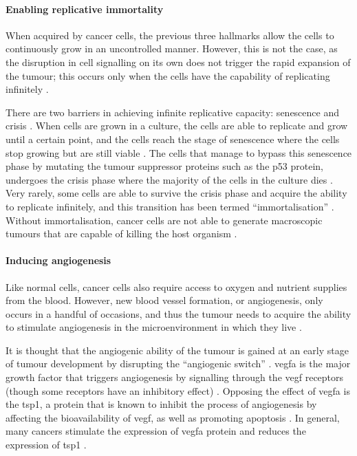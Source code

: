 \paragraph{Enabling replicative immortality}

\noindent
When acquired by cancer cells, the previous three hallmarks allow the cells to continuously grow in an uncontrolled manner.
However, this is not the case, as the disruption in cell signalling on its own does not trigger the rapid expansion of the tumour; this occurs only when the cells have the capability of replicating infinitely \citep{Hanahan2000, Hanahan2011}.

There are two barriers in achieving infinite replicative capacity: senescence and crisis \citep{Hanahan2011}.
When cells are grown in a culture, the cells are able to replicate and grow until a certain point, and the cells reach the stage of senescence where the cells stop growing but are still viable \citep{Hanahan2011}.
The cells that manage to bypass this senescence phase by mutating the tumour suppressor proteins such as the p53 protein, undergoes the crisis phase where the majority of the cells in the culture dies \citep{Hanahan2011}.
Very rarely, some cells are able to survive the crisis phase and acquire the ability to replicate infinitely, and this transition has been termed ``immortalisation'' \citep{Hanahan2011, Wright1989}.
Without immortalisation, cancer cells are not able to generate macroscopic tumours that are capable of killing the host organism \citep{Hanahan2000,Hanahan2011}.

\paragraph{Inducing angiogenesis}

\noindent
Like normal cells, cancer cells also require access to oxygen and nutrient supplies from the blood.
However, new blood vessel formation, or angiogenesis, only occurs in a handful of occasions, and thus the tumour needs to acquire the ability to stimulate angiogenesis in the microenvironment in which they live \citep{Hanahan2011}.

It is thought that the angiogenic ability of the tumour is gained at an early stage of tumour development by disrupting the ``angiogenic switch'' \citep{Hanahan2011}.
\Gls{vegfa} is the major growth factor that triggers angiogenesis by signalling through the \acrshort{vegf} receptors (though some receptors have an inhibitory effect) \citep{Yancopoulos2000}.
Opposing the effect of \Gls{vegfa} is the \gls{tsp1}, a protein that is known to inhibit the process of angiogenesis by affecting the bioavailability of \acrshort{vegf}, as well as promoting apoptosis \citep{Kazerounian2008}.
In general, many cancers stimulate the expression of \gls{vegfa} protein and reduces the expression of \gls{tsp1} \citep{Kazerounian2008}.

